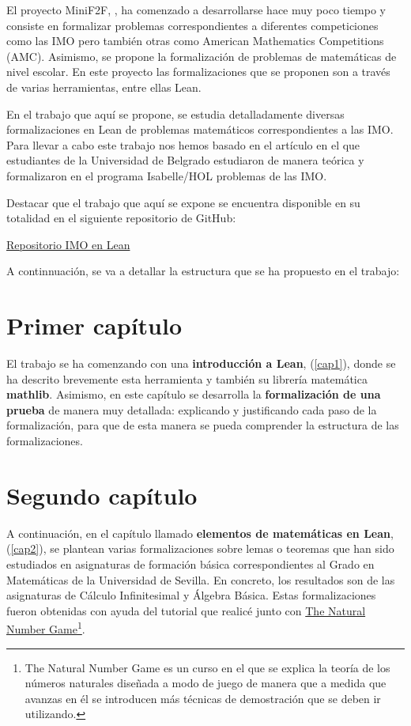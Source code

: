 El proyecto MiniF2F, \cite{mini}, ha comenzado a desarrollarse hace muy
poco tiempo y consiste en formalizar problemas correspondientes a
diferentes competiciones como las IMO pero también otras como American
Mathematics Competitions (AMC). Asimismo, se propone la formalización de
problemas de matemáticas de nivel escolar. En este proyecto las
formalizaciones que se proponen son a través de varias herramientas,
entre ellas Lean.

En el trabajo que aquí se propone, se estudia detalladamente diversas
formalizaciones en Lean de problemas matemáticos correspondientes a las
IMO. Para llevar a cabo este trabajo nos hemos basado en el artículo
\cite{ART} en el que estudiantes de la Universidad de Belgrado
estudiaron de manera teórica y formalizaron en el programa Isabelle/HOL
problemas de las IMO.

Destacar que el trabajo que aquí se expone se encuentra disponible en
su totalidad en el siguiente repositorio de GitHub:

\begin{center}
\href{https://github.com/saradiazr11/IMO_en_Lean}{Repositorio IMO en Lean}
\end{center}

A continnuación, se va a detallar la estructura que se ha propuesto en
el trabajo:

\section*{Primer capítulo}

El trabajo se ha comenzando con una \textbf{introducción a Lean},
(\ref{cap1}), donde se ha descrito brevemente esta herramienta y también
su librería matemática \textbf{mathlib}. Asimismo, en este capítulo se
desarrolla la \textbf{formalización de una prueba} de manera muy
detallada: explicando y justificando cada paso de la formalización, para
que de esta manera se pueda comprender la estructura de las
formalizaciones.

\section*{Segundo capítulo}

A continuación, en el capítulo llamado \textbf{elementos de matemáticas
  en Lean}, (\ref{cap2}), se plantean varias formalizaciones sobre lemas
o teoremas que han sido estudiados en asignaturas de formación básica
correspondientes al Grado en Matemáticas de la Universidad de Sevilla.
En concreto, los resultados son de las asignaturas de Cálculo
Infinitesimal y Álgebra Básica. Estas formalizaciones fueron obtenidas
con ayuda del tutorial \cite{tutor} que realicé junto con
\href{https://www.ma.imperial.ac.uk/~buzzard/xena/natural_number_game/}{The
  Natural Number Game}\footnote{The Natural Number Game es un curso en
  el que se explica la teoría de los números naturales diseñada a modo
  de juego de manera que a medida que avanzas en él se introducen más
  técnicas de demostración que se deben ir utilizando.}.

